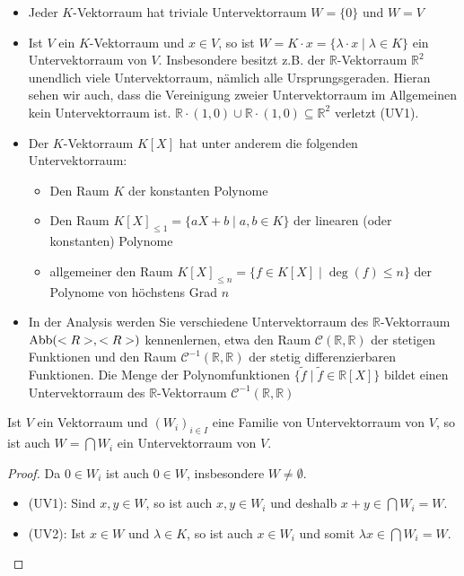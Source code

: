 \begin{example}
	\begin{itemize}
		\item Jeder $K$-Vektorraum hat triviale Untervektorraum $W=\{0\}$ und $W=V$
		\item Ist $V$ ein $K$-Vektorraum und $x \in V$, so ist $W=K\cdot x=\{\lambda\cdot x \mid \lambda \in K\}$ ein Untervektorraum von $V$. 
		Insbesondere besitzt z.B. der $\mathbb R$-Vektorraum $\mathbb R^2$ unendlich viele Untervektorraum, nämlich alle Ursprungsgeraden. Hieran 
		sehen wir auch, dass die Vereinigung zweier Untervektorraum im Allgemeinen kein Untervektorraum ist. $\mathbb R\cdot (1,0) \cup \mathbb 
		R\cdot (1,0) \subseteq \mathbb R^2$ verletzt (UV1).
		\item Der $K$-Vektorraum $K[X]$ hat unter anderem die folgenden Untervektorraum:
		\begin{itemize}
			\item Den Raum $K$ der konstanten Polynome
			\item Den Raum $K[X]_{\le 1}=\{aX+b \mid a,b \in K\}$ der linearen (oder konstanten) Polynome
			\item allgemeiner den Raum $K[X]_{\le n}=\{f \in K[X] \mid \deg(f) \le n\}$ der Polynome von höchstens Grad $n$
		\end{itemize}
		\item In der Analysis werden Sie verschiedene Untervektorraum des $\mathbb R$-Vektorraum $\operatorname{Abb}(<R>,<R>)$ kennenlernen, etwa
		den Raum $\mathcal C(\mathbb R,\mathbb R)$ der stetigen Funktionen und den Raum $\mathcal C^{-1}(\mathbb R,\mathbb 
		R)$ der stetig differenzierbaren Funktionen. Die Menge der Polynomfunktionen $\{\tilde f\mid \tilde f\in \mathbb R[X]\}$ bildet
		einen Untervektorraum des $\mathbb R$-Vektorraum $\mathcal C^{-1}(\mathbb R,\mathbb R)$
	\end{itemize}
\end{example}


\begin{lemma}
	Ist $V$ ein Vektorraum und $(W_i)_{i \in I}$ eine Familie von Untervektorraum von $V$, so ist auch $W=\bigcap W_i$ 
	ein Untervektorraum von $V$.
\end{lemma}
\begin{proof}
	Da $0 \in W_i$ ist auch $0 \in W$, insbesondere $W\neq\emptyset$.
	\begin{itemize}
		\item (UV1): Sind $x,y \in W$, so ist auch $x,y \in W_i$ und deshalb $x+y\in \bigcap W_i = W$.
		\item (UV2): Ist $x \in W$ und $\lambda \in K$, so ist auch $x \in W_i$ und somit $\lambda x\in \bigcap W_i=W$.
	\end{itemize}
\end{proof}

